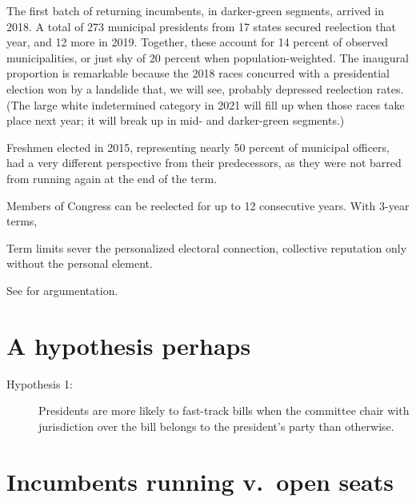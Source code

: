 \documentclass[letter,12pt]{article}
\begin{document}
The first batch of returning incumbents, in darker-green segments, arrived in 2018. A total of 273 municipal presidents from 17 states secured reelection that year, and 12 more in 2019. Together, these account for 14 percent of observed municipalities, or just shy of 20 percent when population-weighted. The inaugural proportion is remarkable because the 2018 races concurred with a presidential election won by a landslide that, we will see, probably depressed reelection rates. (The large white indetermined category in 2021 will fill up when those races take place next year; it will break up in mid- and darker-green segments.)

Freshmen elected in 2015, representing nearly 50 percent of municipal officers, had a very different perspective from their predecessors, as they were not barred from running again at the end of the term.  

Members of Congress can be reelected for up to 12 consecutive years. With 3-year terms, 

Term limits sever the personalized electoral connection, collective reputation only without the personal element.

See \citet{cain.etal.1987} for argumentation.

\section{A hypothesis perhaps}

\begin{description}
  \item [Hypothesis 1:] Presidents are more likely to fast-track bills when the committee chair with jurisdiction over the bill  belongs to the president's party than otherwise.
\end{description}

\section{Incumbents running v.\ open seats}
\end{document}
